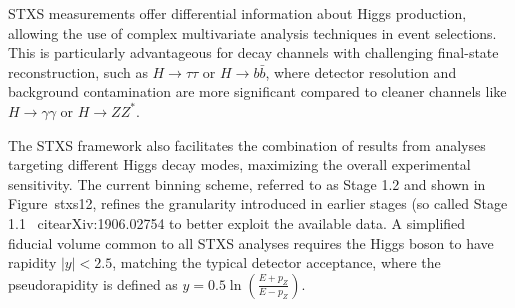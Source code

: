 \documentclass[11pt,twoside]{book}
\begin{document}
STXS measurements offer differential information about Higgs production, allowing the use of complex multivariate analysis techniques in event selections. This is particularly advantageous for decay channels with challenging final-state reconstruction, such as $H \to \tau\tau$ or $H \to b\bar{b}$, where detector resolution and background contamination are more significant compared to cleaner channels like $H \to \gamma\gamma$ or $H \to ZZ^*$.

The STXS framework also facilitates the combination of results from analyses targeting different Higgs decay modes, maximizing the overall experimental sensitivity. The current binning scheme, referred to as Stage 1.2 and shown in Figure~{stxs12}, refines the granularity introduced in earlier stages (so called Stage 1.1 ~cite{arXiv:1906.02754} to better exploit the available data. A simplified fiducial volume common to all STXS analyses requires the Higgs boson to have rapidity $|y| < 2.5$, matching the typical detector acceptance, where the pseudorapidity is defined as $y = 0.5 \ln{\left( \frac{E+p_Z}{E-p_Z} \right)}$.
\end{document}
